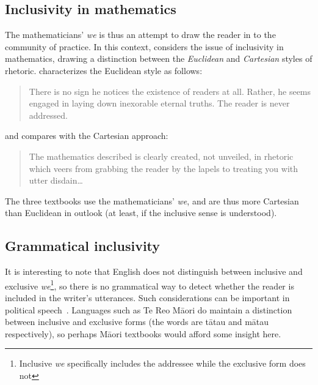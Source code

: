 \subsection{Inclusivity in mathematics}

The mathematicians' \emph{we} is thus an attempt to draw the reader in
to the community of practice.  In this context, 
considers the issue of inclusivity in mathematics, drawing a
distinction between the \emph{Euclidean} and \emph{Cartesian} styles
of rhetoric.  \citeauthor{fauvel1988} characterizes the Euclidean
style as follows:

\begin{singlespace}
\begin{quote}
 There is no sign he notices the existence of readers at all.  Rather,
 he seems engaged in laying down inexorable eternal truths.  The
 reader is never addressed.
\end{quote}
\end{singlespace}

\noindent and compares with the Cartesian approach:

\begin{singlespace}
\begin{quote}
The mathematics described is clearly created, not unveiled, in
rhetoric which veers from grabbing the reader by the lapels to
treating you with utter disdain\ldots
\end{quote}
\end{singlespace}

\noindent The three textbooks use the mathematicians' \emph{we}, and
are thus more Cartesian than Euclidean in outlook (at least, if the
inclusive sense is understood).

\subsection{Grammatical inclusivity}

It is interesting to note that English does not distinguish between
inclusive and exclusive \emph{we}\footnote{Inclusive \emph{we}
  specifically includes the addressee while the exclusive form does
  not}, so there is no grammatical way to detect whether the reader is
included in the writer's utterances.  Such considerations can be
important in political speech~\parencite{chen2006}.  Languages such as
Te Reo M\={a}ori do maintain a distinction between inclusive and
exclusive forms (the words are t\={a}tau and m\={a}tau respectively),
so perhaps M\={a}ori textbooks would afford some insight here.

